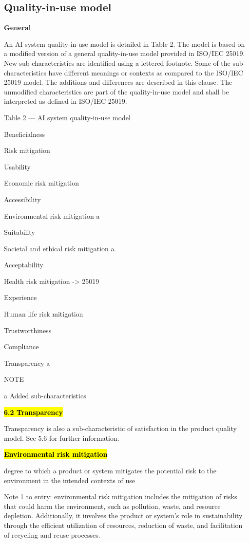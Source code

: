 \documentclass[
  letterpaper,
  DIV=11,
  numbers=noendperiod,
  oneside]{scrreprt}
\begin{document}
\begin{tcolorbox}
\section{Quality-in-use model}\label{quality-in-use-model}

\textbf{General}

An AI system quality-in-use model is detailed in Table 2. The model is
based on a modified version of a general quality-in-use model provided
in ISO/IEC 25019. New sub-characteristics are identified using a
lettered footnote. Some of the sub-characteristics have different
meanings or contexts as compared to the ISO/IEC 25019 model. The
additions and differences are described in this clause. The unmodified
characteristics are part of the quality-in-use model and shall be
interpreted as defined in ISO/IEC 25019.

Table 2 --- AI system quality-in-use model

Beneficialness

Risk mitigation

Usability

Economic risk mitigation

Accessibility

Environmental risk mitigation a

Suitability

Societal and ethical risk mitigation a

Acceptability

Health risk mitigation -\textgreater{} 25019

Experience

Human life risk mitigation

Trustworthiness

Compliance

Transparency a

NOTE

a Added sub-characteristics

\textbf{\hl{6.2 Transparency}}

Transparency is also a sub-characteristic of satisfaction in the product
quality model. See 5.6 for further information.

\textbf{\hl{Environmental risk mitigation}}

degree to which a product or system mitigates the potential risk to the
environment in the intended contexts of use

Note 1 to entry: environmental risk mitigation includes the mitigation
of risks that could harm the environment, such as pollution, waste, and
resource depletion. Additionally, it involves the product or system's
role in sustainability through the efficient utilization of resources,
reduction of waste, and facilitation of recycling and reuse processes.


\end{tcolorbox}
\end{document}
